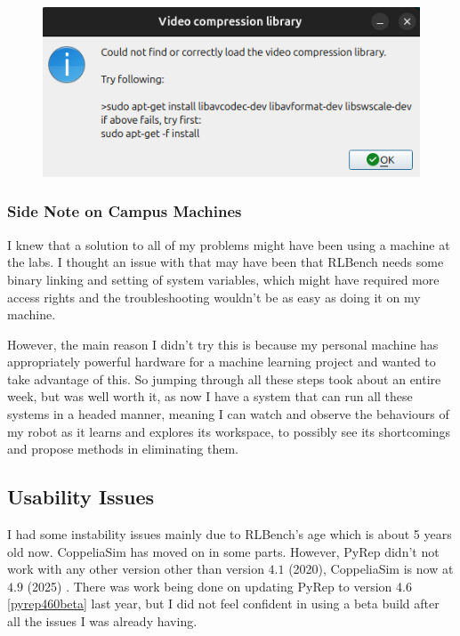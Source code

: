 \begin{figure}[htpb] %
  \centering
  \includegraphics[scale=0.3]{assets/early-work/missing-libs.png}
  \caption{}\label{fig:missing-libs}
\end{figure}


\subsubsection{Side Note on Campus Machines}
I knew that a solution to all of my problems might have been using a machine at the labs. I thought an issue with that may have been that RLBench needs some binary linking and setting of system variables, which might have required more access rights and the troubleshooting wouldn't be as easy as doing it on my machine. 

However, the main reason I didn't try this is because my personal machine has appropriately powerful hardware for a machine learning project and wanted to take advantage of this. So jumping through all these steps took about an entire week, but was well worth it, as now I have a system that can run all these systems in a headed manner, meaning I can watch and observe the behaviours of my robot as it learns and explores its workspace, to possibly see its shortcomings and propose methods in eliminating them.

\subsection{Usability Issues}
I had some instability issues mainly due to RLBench's age which is about 5 years old now. CoppeliaSim has moved on in some parts. However, PyRep didn't not work with any other version other than version $4.1$ (2020), CoppeliaSim is now at $4.9$ (2025) \cite{coppeliaSimManual}.
There was work being done on updating PyRep to version 4.6 \ref{pyrep460beta} last year, but I did not feel confident in using a beta build after all the issues I was already having.

